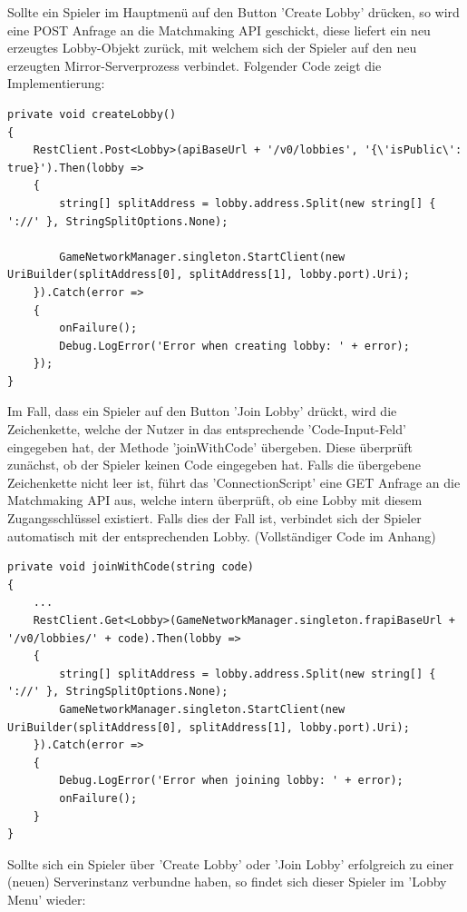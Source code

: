 Sollte ein Spieler im Hauptmenü auf den Button 'Create Lobby' drücken, so wird eine POST Anfrage an die Matchmaking API geschickt, diese liefert ein neu erzeugtes Lobby-Objekt zurück, mit welchem sich der Spieler auf den neu erzeugten Mirror-Serverprozess verbindet. Folgender Code zeigt die Implementierung:

\newpage

\begin{lstlisting}[caption= ConnectionScript.cs createLobby()]
private void createLobby()
{
	RestClient.Post<Lobby>(apiBaseUrl + '/v0/lobbies', '{\'isPublic\': true}').Then(lobby =>
	{
		string[] splitAddress = lobby.address.Split(new string[] { '://' }, StringSplitOptions.None);
		
		GameNetworkManager.singleton.StartClient(new UriBuilder(splitAddress[0], splitAddress[1], lobby.port).Uri);
	}).Catch(error =>
	{
		onFailure();
		Debug.LogError('Error when creating lobby: ' + error);
	});
}	
\end{lstlisting}

Im Fall, dass ein Spieler auf den Button 'Join Lobby' drückt, wird die Zeichenkette, welche der Nutzer in das entsprechende 'Code-Input-Feld' eingegeben hat, der Methode 'joinWithCode' übergeben. Diese überprüft zunächst, ob der Spieler keinen Code eingegeben hat. Falls die übergebene Zeichenkette nicht leer ist, führt das 'ConnectionScript' eine GET Anfrage an die Matchmaking API aus, welche intern überprüft, ob eine Lobby mit diesem Zugangsschlüssel existiert. Falls dies der Fall ist, verbindet sich der Spieler automatisch mit der entsprechenden Lobby. (Vollständiger Code im Anhang)

\begin{lstlisting}[caption= ConnectionScript.cs joinWithCode()]
private void joinWithCode(string code)
{
	...		
	RestClient.Get<Lobby>(GameNetworkManager.singleton.frapiBaseUrl + '/v0/lobbies/' + code).Then(lobby =>
	{
		string[] splitAddress = lobby.address.Split(new string[] { '://' }, StringSplitOptions.None);
		GameNetworkManager.singleton.StartClient(new UriBuilder(splitAddress[0], splitAddress[1], lobby.port).Uri);
	}).Catch(error =>
	{
		Debug.LogError('Error when joining lobby: ' + error);
		onFailure();
	}
}
\end{lstlisting}

Sollte sich ein Spieler über 'Create Lobby' oder 'Join Lobby' erfolgreich zu einer (neuen) Serverinstanz verbundne haben, so findet sich dieser Spieler im 'Lobby Menu' wieder:

